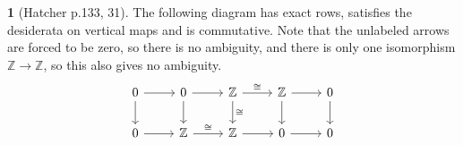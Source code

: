\documentclass[10.5pt]{article}
\theoremstyle{definition}
\newtheorem{pb}{}
\begin{document}
    \begin{pb}[Hatcher p.133, 31]
        The following diagram has exact rows, satisfies the desiderata on vertical maps and is commutative. Note that the unlabeled arrows are forced to be zero, so there is no ambiguity, and there is only one isomorphism \(\mathbb{Z} \to \mathbb{Z}\), so this also gives no ambiguity.
        \begin{equation*}
            \begin{tikzcd}
                0 \arrow[r] \arrow[d] &0 \arrow[r] \arrow[d] & \mathbb{Z} \arrow[r,"\cong"] \arrow[d,"\cong"] & \mathbb{Z} \arrow[r] \arrow[d] &0 \arrow[d] \\
                0 \arrow[r] &\mathbb{Z} \arrow[r,"\cong"] & \mathbb{Z} \arrow[r] & 0 \arrow[r] &0
            \end{tikzcd}
        \end{equation*}
    \end{pb}
\end{document}
